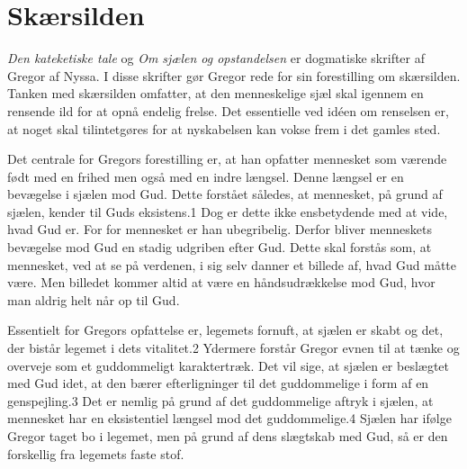 \chapter{Skærsilden}
\textit{Den kateketiske tale} og \textit{Om sjælen og opstandelsen} er dogmatiske skrifter af Gregor af Nyssa. I disse skrifter gør Gregor rede for sin forestilling om skærsilden. Tanken med skærsilden omfatter, at den menneskelige sjæl skal igennem en rensende ild for at opnå endelig frelse. Det essentielle ved idéen om renselsen er, at noget skal tilintetgøres for at nyskabelsen kan vokse frem i det gamles sted.

Det centrale for Gregors forestilling er, at han opfatter mennesket som værende født med en frihed men også med en indre længsel. Denne længsel er en bevægelse i sjælen mod Gud. Dette forstået således, at mennesket, på grund af sjælen, kender til Guds eksistens.1 Dog er dette ikke ensbetydende med at vide, hvad Gud er. For for mennesket er han ubegribelig. Derfor bliver menneskets bevægelse mod Gud en stadig udgriben efter Gud. Dette skal forstås som, at mennesket, ved at se på verdenen, i sig selv danner et billede af, hvad Gud måtte være. Men billedet kommer altid at være en håndsudrækkelse mod Gud, hvor man aldrig helt når op til Gud.

Essentielt for Gregors opfattelse er, legemets fornuft, at sjælen er skabt og det, der bistår legemet i dets vitalitet.2 Ydermere forstår Gregor evnen til at tænke og overveje som et guddommeligt karaktertræk. Det vil sige, at sjælen er beslægtet med Gud idet, at den bærer efterligninger til det guddommelige i form af en genspejling.3 Det er nemlig på grund af det guddommelige aftryk i sjælen, at mennesket har en eksistentiel længsel mod det guddommelige.4 Sjælen har ifølge Gregor taget bo i legemet, men på grund af dens slægtskab med Gud, så er den forskellig fra legemets faste stof.

